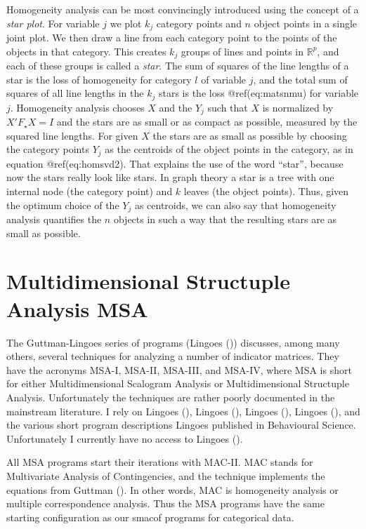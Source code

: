 \documentclass[
  12pt,
  letterpaper,
  DIV=11,
  numbers=noendperiod]{scrartcl}
\begin{document}
Homogeneity analysis can be most convincingly introduced using the
concept of a \emph{star plot}. For variable \(j\) we plot \(k_j\)
category points and \(n\) object points in a single joint plot. We then
draw a line from each category point to the points of the objects in
that category. This creates \(k_j\) groups of lines and points in
\(\mathbb{R}^p\), and each of these groups is called a \emph{star}. The
sum of squares of the line lengths of a star is the loss of homogeneity
for category \(l\) of variable \(j\), and the total sum of squares of
all line lengths in the \(k_j\) stars is the loss @ref(eq:matsnmu) for
variable \(j\). Homogeneity analysis chooses \(X\) and the \(Y_j\) such
that \(X\) is normalized by \(X'F_\star X=I\) and the stars are as small
or as compact as possible, measured by the squared line lengths. For
given \(X\) the stars are as small as possible by choosing the category
points \(Y_j\) as the centroids of the object points in the category, as
in equation @ref(eq:homsvd2). That explains the use of the word
``star'', because now the stars really look like stars. In graph theory
a star is a tree with one internal node (the category point) and \(k\)
leaves (the object points). Thus, given the optimum choice of the
\(Y_j\) as centroids, we can also say that homogeneity analysis
quantifies the \(n\) objects in such a way that the resulting stars are
as small as possible.

\section{Multidimensional Structuple Analysis
MSA}\label{multidimensional-structuple-analysis-msa}

The Guttman-Lingoes series of programs (Lingoes
()) discusses, among many others, several
techniques for analyzing a number of indicator matrices. They have the
acronyms MSA-I, MSA-II, MSA-III, and MSA-IV, where MSA is short for
either Multidimensional Scalogram Analysis or Multidimensional
Structuple Analysis. Unfortunately the techniques are rather poorly
documented in the mainstream literature. I rely on Lingoes
(), Lingoes
(), Lingoes
(), Lingoes
(), and the various short program
descriptions Lingoes published in Behavioural Science. Unfortunately I
currently have no access to Lingoes ().

All MSA programs start their iterations with MAC-II. MAC stands for
Multivariate Analysis of Contingencies, and the technique implements the
equations from Guttman (). In other
words, MAC is homogeneity analysis or multiple correspondence analysis.
Thus the MSA programs have the same starting configuration as our smacof
programs for categorical data.
\end{document}
